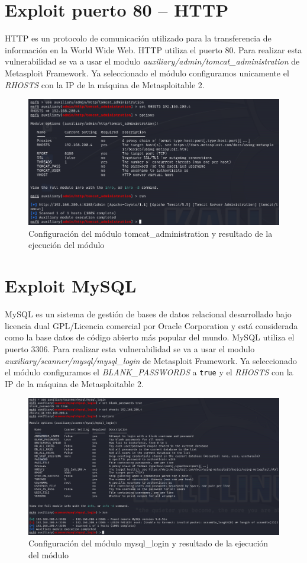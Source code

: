 \documentclass[11pt]{report}
\begin{document}
\section{Exploit puerto 80 – HTTP}
HTTP es un protocolo de comunicación utilizado para la transferencia de información en la World Wide Web. HTTP utiliza el puerto 80. Para realizar esta vulnerabilidad
se va a usar el modulo \emph{auxiliary/admin/tomcat\_administration} de Metasploit Framework. Ya seleccionado el módulo configuramos unicamente el \emph{RHOSTS} con la IP de la máquina de Metasploitable 2.
\begin{figure}[H]
  \centering
  \includegraphics[scale=0.6]{img/http.png}
  \caption{Configuración del módulo tomcat\_administration y resultado de la ejecución del módulo}
\end{figure}

\newpage

\section{Exploit MySQL}
MySQL es un sistema de gestión de bases de datos relacional desarrollado bajo licencia dual GPL/Licencia comercial por Oracle Corporation y está considerada como la base datos de código abierto más popular del mundo. MySQL utiliza el puerto 3306. Para realizar esta vulnerabilidad
se va a usar el modulo \emph{auxiliary/scanner/mysql/mysql\_login} de Metasploit Framework. Ya seleccionado el módulo configuramos el \emph{BLANK\_PASSWORDS} a \texttt{true} y el \emph{RHOSTS} con la IP de la máquina de Metasploitable 2.
\begin{figure}[H]
  \centering
  \includegraphics[scale=0.5]{img/mysql.png}
  \caption{Configuración del módulo mysql\_login y resultado de la ejecución del módulo}
\end{figure}
\end{document}
